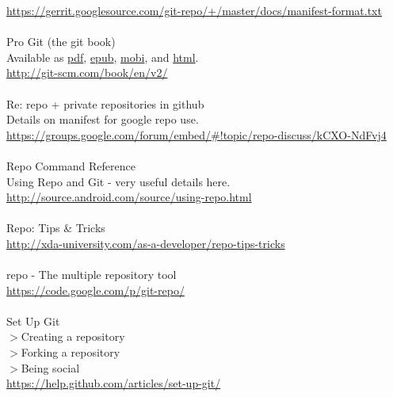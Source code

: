 \documentclass[12pt,letterpaper,dvips]{article}
\begin{document}
\href{https://gerrit.googlesource.com/git-repo/+/master/docs/manifest-format.txt}{https://gerrit.googlesource.com/git-repo/+/master/docs/manifest-format.txt}
\\
\\
\noindent Pro Git (the git book)\\
Available as
  \href{https://progit2.s3.amazonaws.com/en/2015-08-09-23511/progit-en.661.pdf}{pdf},
  \href{https://progit2.s3.amazonaws.com/en/2015-08-09-23511/progit-en.661.epub}{epub},
  \href{https://progit2.s3.amazonaws.com/en/2015-08-09-23511/progit-en.661.mobi}{mobi},
  and \href{https://progit2.s3.amazonaws.com/en/2015-08-09-23511/progit-en.661.zip}{html}.\\
\href{http://git-scm.com/book/en/v2/}{http://git-scm.com/book/en/v2/}
\\
\\
Re: repo + private repositories in github\\
Details on manifest for google repo use.\\
\href{https://groups.google.com/forum/embed/\#!topic/repo-discuss/kCXO-NdFvj4}{https://groups.google.com/forum/embed/\#!topic/repo-discuss/kCXO-NdFvj4}
\\
\\
Repo Command Reference\\
Using Repo and Git - very useful details here.\\
\href{http://source.android.com/source/using-repo.html}{http://source.android.com/source/using-repo.html}
\\
\\
Repo: Tips \& Tricks\\
\href{http://xda-university.com/as-a-developer/repo-tips-tricks}{http://xda-university.com/as-a-developer/repo-tips-tricks}
\\
\\
repo - The multiple repository tool\\
\href{https://code.google.com/p/git-repo/}{https://code.google.com/p/git-repo/}
\\
\\
Set Up Git\\
$>$Creating a repository\\
$>$Forking a repository\\
$>$Being social\\
\href{https://help.github.com/articles/set-up-git/}{https://help.github.com/articles/set-up-git/}
\\
\\
\end{document}
